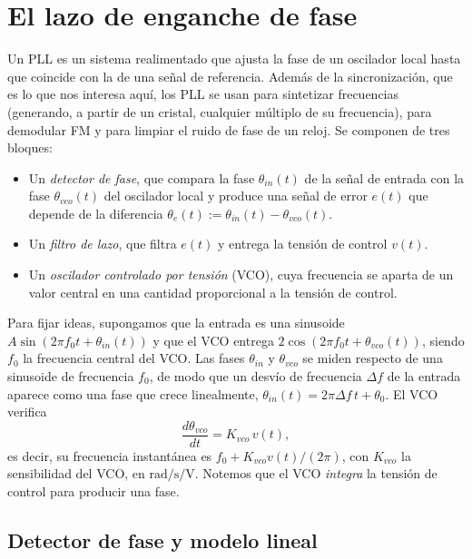\section{El lazo de enganche de fase}\label{sec:pll}

Un PLL es un sistema realimentado que ajusta la fase de un oscilador local hasta que coincide con la de una señal de referencia. Además de la sincronización, que es lo que nos interesa aquí, los PLL se usan para sintetizar frecuencias (generando, a partir de un cristal, cualquier múltiplo de su frecuencia), para demodular FM y para limpiar el ruido de fase de un reloj. Se componen de tres bloques:
\begin{itemize}
    \item Un \emph{detector de fase}, que compara la fase $\theta_{in}(t)$ de la señal de entrada con la fase $\theta_{vco}(t)$ del oscilador local y produce una señal de error $e(t)$ que depende de la diferencia $\theta_e(t):=\theta_{in}(t)-\theta_{vco}(t)$.
    \item Un \emph{filtro de lazo}, que filtra $e(t)$ y entrega la tensión de control $v(t)$.
    \item Un \emph{oscilador controlado por tensión} (VCO), cuya frecuencia se aparta de un valor central en una cantidad proporcional a la tensión de control.
\end{itemize}

Para fijar ideas, supongamos que la entrada es una sinusoide $A\sin(2\pi f_0 t+\theta_{in}(t))$ y que el VCO entrega $2\cos(2\pi f_0 t+\theta_{vco}(t))$, siendo $f_0$ la frecuencia central del VCO. Las fases $\theta_{in}$ y $\theta_{vco}$ se miden respecto de una sinusoide de frecuencia $f_0$, de modo que un desvío de frecuencia $\Delta f$ de la entrada aparece como una fase que crece linealmente, $\theta_{in}(t)=2\pi\Delta f\,t+\theta_0$. El VCO verifica
\begin{equation}\label{eq:vco}
    \frac{d\theta_{vco}}{dt} = K_{vco}\, v(t),
\end{equation}
es decir, su frecuencia instantánea es $f_0+K_{vco}v(t)/(2\pi)$, con $K_{vco}$ la sensibilidad del VCO, en $\unit{\radian\per\second\per\volt}$. Notemos que el VCO \emph{integra} la tensión de control para producir una fase.

\subsection{Detector de fase y modelo lineal}\label{sec:pll lineal}

